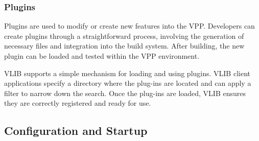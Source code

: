 \subsubsection{Plugins}
Plugins are used to modify or create new features into the VPP. 
Developers can create plugins through a straightforward process, involving the generation of necessary files and integration into the build system. 
After building, the new plugin can be loaded and tested within the VPP environment. 

VLIB supports a simple mechanism for loading and using plugins. 
VLIB client applications specify a directory where the plug-ins are located and can apply a filter to narrow down the search. 
Once the plug-ins are loaded, VLIB ensures they are correctly registered and ready for use.


\subsection{Configuration and Startup}
